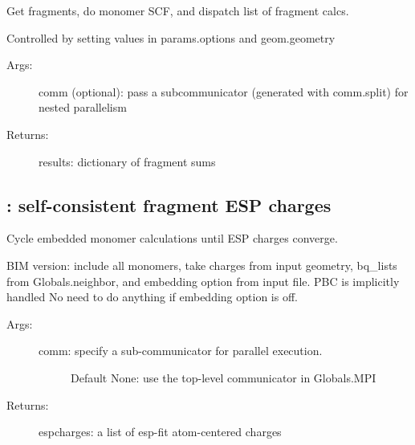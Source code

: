 \documentclass[letterpaper,10pt,english]{sphinxmanual}
\begin{document}

\begin{fulllineitems}
\label{\detokenize{bim:bim.bim.kernel}}
Get fragments, do monomer SCF, and dispatch list of fragment calcs.

Controlled by setting values in params.options and geom.geometry
\begin{description}
\item[{Args:}] \leavevmode
comm (optional): pass a subcommunicator (generated with comm.split)
for nested parallelism

\item[{Returns:}] \leavevmode
results: dictionary of fragment sums

\end{description}

\end{fulllineitems}



\subsection{: self-consistent fragment ESP charges}
\label{\detokenize{bim:monomerscf-self-consistent-fragment-esp-charges}}\label{\detokenize{bim:module-bim.monomerscf}}

\begin{fulllineitems}
\label{\detokenize{bim:bim.monomerscf.monomerSCF}}
Cycle embedded monomer calculations until ESP charges converge.

BIM version: include all monomers, take charges from input geometry,
bq\_lists from Globals.neighbor, and embedding option from input file. PBC is
implicitly handled No need to do anything if embedding option is off.
\begin{description}
\item[{Args:}] \leavevmode\begin{description}
\item[{comm: specify a sub-communicator for parallel execution.}] \leavevmode
Default None: use the top-level communicator in Globals.MPI

\end{description}

\item[{Returns:}] \leavevmode
espcharges: a list of esp-fit atom-centered charges

\end{description}

\end{fulllineitems}
\end{document}
